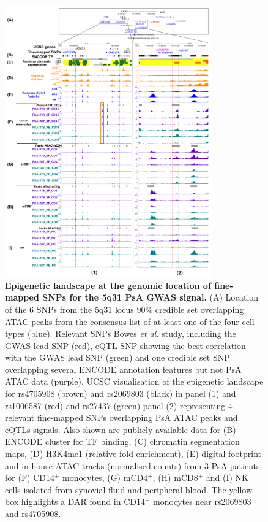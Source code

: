 \begin{figure}[htbp]
\centering
\includegraphics[width=0.8\textwidth]{./Results3/pdfs/UCSC_chr5q31_credible_set_all_cell_types_multipanel_final}
\caption[Epigenetic landscape at the genomic location of fine-mapped SNPs for the 5q31 PsA GWAS signal.]{\textbf{Epigenetic landscape at the genomic location of fine-mapped SNPs for the 5q31 PsA GWAS signal.} (A) Location of the 6 SNPs from the 5q31 locus 90\% credible set overlapping ATAC peaks from the consensus list of at least one of the four cell types (blue). Relevant SNPs Bowes \textit{et al.} study, including the GWAS lead SNP (red), eQTL SNP showing the best correlation with the GWAS lead SNP (green) and one credible set SNP overlapping several ENCODE annotation features but not PsA ATAC data (purple). UCSC visualisation of the epigenetic landscape for rs4705908 (brown) and rs2069803 (black) in panel (1) and rs1006587 (red) and rs27437 (green) panel (2) representing 4 relevant fine-mapped SNPs overlapping PsA ATAC peaks and eQTLs signals. Also shown are publicly available data for (B) ENCODE cluster for TF binding, (C) chromatin segmentation maps, (D) H3K4me1 (relative fold-enrichment), (E) digital footprint and in-house ATAC tracks (normalised counts) from 3 PsA patients for (F) CD14$^+$ monocytes, (G) mCD4$^+$, (H) mCD8$^+$ and (I) NK cells isolated from synovial fluid and peripheral blood. The yellow box highlights a DAR found in CD14$^+$ monocytes near rs2069803 and rs4705908.}
\label{figure:5q31_fine_mapping_SNPs_epigenetic_track}
\end{figure}


